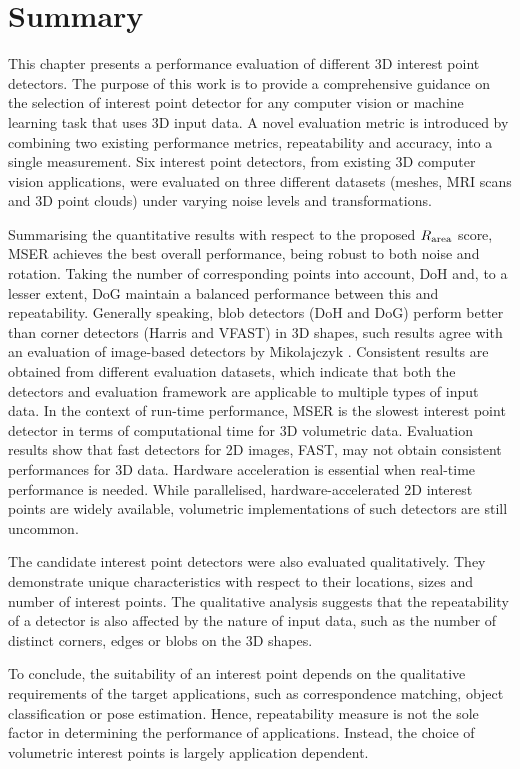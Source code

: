 


\section{Summary}
\label{sec/eval/conclusion}
This chapter presents a performance evaluation of different 3D interest point detectors.  
The purpose of this work is to provide a comprehensive guidance on the selection of interest point detector for any computer vision or machine learning task that uses 3D input data. 
A novel evaluation metric is introduced by combining two existing performance metrics, repeatability and accuracy, into a single measurement. 
Six interest point detectors, from existing 3D computer vision applications, were evaluated on three different datasets (meshes, MRI scans and 3D point clouds) under varying noise levels and transformations. 

Summarising the quantitative results with respect to the proposed $R_\textrm{area}$ score, MSER achieves the best overall performance, being robust to both noise and rotation. Taking the number of corresponding points into account, DoH and, to a lesser extent, DoG maintain a balanced performance between this and repeatability. Generally speaking, blob detectors (\eg DoH and DoG) perform better than corner detectors (\eg Harris and VFAST) in 3D shapes, such results agree with an evaluation of image-based detectors by Mikolajczyk \etal \cite{Mikolajczyk2005}. Consistent results are obtained from different evaluation datasets, which indicate that both the detectors and evaluation framework are applicable to multiple types of input data. In the context of run-time performance, MSER is the slowest interest point detector in terms of computational time for 3D volumetric data. Evaluation results show that fast detectors for 2D images, \eg FAST, may not obtain consistent performances for 3D data. Hardware acceleration is essential when real-time performance is needed. While parallelised, hardware-accelerated 2D interest points are widely available, volumetric implementations of such detectors are still uncommon. 

The candidate interest point detectors were also evaluated qualitatively. 
They demonstrate unique characteristics with respect to their locations, sizes and number of interest points. 
The qualitative analysis suggests that the repeatability of a detector is also affected by the nature of input data, such as the number of distinct corners, edges or blobs on the 3D shapes. 

To conclude, the suitability of an interest point depends on the qualitative requirements of the target applications, such as correspondence matching, object classification or pose estimation. Hence, repeatability measure is not the sole factor in determining the performance of applications. Instead, the choice of volumetric interest points is largely application dependent. 
